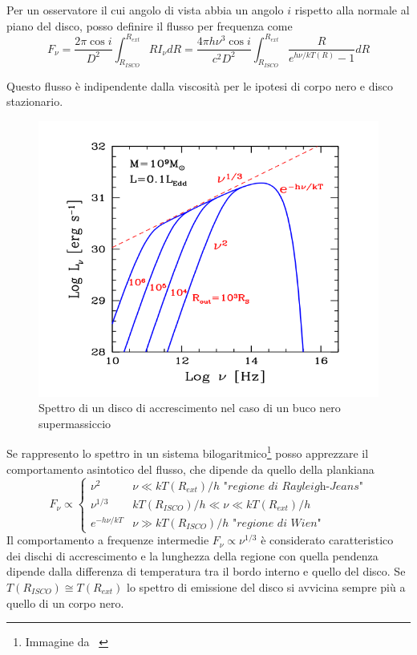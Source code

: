 \documentclass[a4paperbi]{article}
\begin{document}
	Per un osservatore il cui angolo di vista abbia un angolo $i$ rispetto alla normale al piano del disco, posso definire il flusso per frequenza come
	\begin{equation}
		F_\nu=\frac{2\pi \cos{i}}{D^2}\int^{R_{ext}}_{R_{ISCO}}RI_\nu dR=\frac{4\pi h\nu^3\cos{i}}{c^2D^2}\int^{R_{ext}}_{R_{ISCO}}\frac{R}{e^{h\nu/kT(R)}-1}dR
	\end{equation}

	Questo flusso è indipendente dalla viscosità per le ipotesi di corpo nero e disco stazionario.
	
	\begin{figure}[H]
		\centering
		\includegraphics[width=0.7\linewidth]{SpettroDiscoGhisellini}
		\caption{Spettro di un disco di accrescimento nel caso di un buco nero supermassiccio}
		\label{fig:SpettroDiscoGhisellini}
	\end{figure}	

	Se rappresento lo spettro in un sistema bilogaritmico\footnote{Immagine da ~\cite{GhiselliniRadiativi}} posso apprezzare il comportamento asintotico del flusso, che dipende da quello della plankiana
	\begin{equation}
		F_\nu\propto\begin{cases}
						\nu^2 & \nu\ll kT(R_{ext})/h \textit{ "regione di Rayleigh-Jeans"}\\
						\nu^{1/3} & kT(R_{ISCO})/h\ll\nu\ll kT(R_{ext})/h\\
						e^{-h\nu/kT} & \nu\gg kT(R_{ISCO})/h \textit{ "regione di Wien"}						
					\end{cases}
	\end{equation}
	Il comportamento a frequenze intermedie $F_\nu\propto\nu^{1/3}$ è considerato caratteristico dei dischi di accrescimento e la lunghezza della regione con quella pendenza dipende dalla differenza di temperatura tra il bordo interno e quello del disco. Se $T(R_{ISCO})\cong T(R_{ext})$ lo spettro di emissione del disco si avvicina sempre più a quello di un corpo nero.
\end{document}
